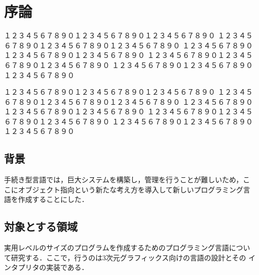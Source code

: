 \documentclass{funthesis}
\begin{document}
\maketitle       %




\tableofcontents
\chapter{序論} %

１２３４５６７８９０１２３４５６７８９０１２３４５６７８９０
１２３４５６７８９０１２３４５６７８９０１２３４５６７８９０
１２３４５６７８９０１２３４５６７８９０１２３４５６７８９０
１２３４５６７８９０１２３４５６７８９０１２３４５６７８９０
１２３４５６７８９０１２３４５６７８９０１２３４５６７８９０

１２３４５６７８９０１２３４５６７８９０１２３４５６７８９０
１２３４５６７８９０１２３４５６７８９０１２３４５６７８９０
１２３４５６７８９０１２３４５６７８９０１２３４５６７８９０
１２３４５６７８９０１２３４５６７８９０１２３４５６７８９０
１２３４５６７８９０１２３４５６７８９０１２３４５６７８９０

\section{背景} %


手続き型言語では，巨大システムを構築し，管理を行うことが難しいため，こ
こにオブジェクト指向という新たな考え方を導入して新しいプログラミング言
語を作成することにした．

\section{対象とする領域}

実用レベルのサイズのプログラムを作成するためのプログラミング言語につい
て研究する．ここで，行うのは3次元グラフィックス向けの言語の設計とその
インタプリタの実装である．
\end{document}
